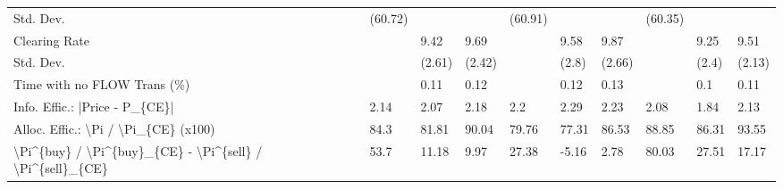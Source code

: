 \begin{tabular}{llllllllll}
 Std. Dev.                                                 & (60.72)  &          &          & (60.91)  &          &          & (60.35)   &           &           \\
 Clearing Rate                                             &          & 9.42     & 9.69     &          & 9.58     & 9.87     &           & 9.25      & 9.51      \\
 Std. Dev.                                                 &          & (2.61)   & (2.42)   &          & (2.8)    & (2.66)   &           & (2.4)     & (2.13)    \\
 Time with no FLOW Trans (\%)                               &          & 0.11     & 0.12     &          & 0.12     & 0.13     &           & 0.1       & 0.11      \\
 Info. Effic.: |Price - P\_\{CE\}|                            & 2.14     & 2.07     & 2.18     & 2.2      & 2.29     & 2.23     & 2.08      & 1.84      & 2.13      \\
 Alloc. Effic.: \textbackslash{}Pi / \textbackslash{}Pi\_\{CE\} (x100)                      & 84.3     & 81.81    & 90.04    & 79.76    & 77.31    & 86.53    & 88.85     & 86.31     & 93.55     \\
 \textbackslash{}Pi\^{}\{buy\} / \textbackslash{}Pi\^{}\{buy\}\_\{CE\} - \textbackslash{}Pi\^{}\{sell\} / \textbackslash{}Pi\^{}\{sell\}\_\{CE\} & 53.7     & 11.18    & 9.97     & 27.38    & -5.16    & 2.78     & 80.03     & 27.51     & 17.17     \\
\hline
\end{tabular}